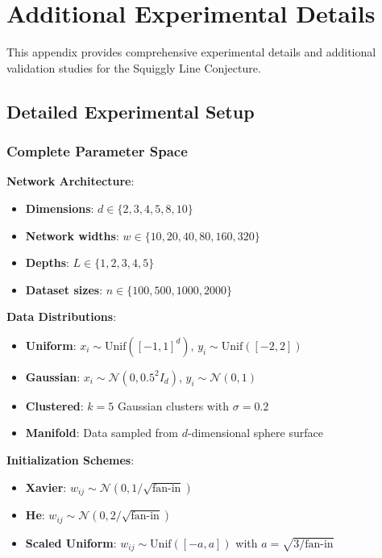 \section{Additional Experimental Details}
\label{sec:additional-experiments}

This appendix provides comprehensive experimental details and additional validation studies for the Squiggly Line Conjecture.

\subsection{Detailed Experimental Setup}
\label{subsec:detailed-setup}

\subsubsection{Complete Parameter Space}

\textbf{Network Architecture}:
\begin{itemize}
    \item \textbf{Dimensions}: $d \in \{2, 3, 4, 5, 8, 10\}$
    \item \textbf{Network widths}: $w \in \{10, 20, 40, 80, 160, 320\}$
    \item \textbf{Depths}: $L \in \{1, 2, 3, 4, 5\}$
    \item \textbf{Dataset sizes}: $n \in \{100, 500, 1000, 2000\}$
\end{itemize}

\textbf{Data Distributions}:
\begin{itemize}
    \item \textbf{Uniform}: $x_i \sim \text{Unif}([-1,1]^d)$, $y_i \sim \text{Unif}([-2,2])$
    \item \textbf{Gaussian}: $x_i \sim \mathcal{N}(0, 0.5^2 I_d)$, $y_i \sim \mathcal{N}(0,1)$
    \item \textbf{Clustered}: $k=5$ Gaussian clusters with $\sigma = 0.2$
    \item \textbf{Manifold}: Data sampled from $d$-dimensional sphere surface
\end{itemize}

\textbf{Initialization Schemes}:
\begin{itemize}
    \item \textbf{Xavier}: $w_{ij} \sim \mathcal{N}(0, 1/\sqrt{\text{fan-in}})$ \cite{Glorot2010UnderstandingTD}
    \item \textbf{He}: $w_{ij} \sim \mathcal{N}(0, 2/\sqrt{\text{fan-in}})$ \cite{He2015DelvingDI}
    \item \textbf{Scaled Uniform}: $w_{ij} \sim \text{Unif}([-a, a])$ with $a = \sqrt{3/\text{fan-in}}$
\end{itemize}

